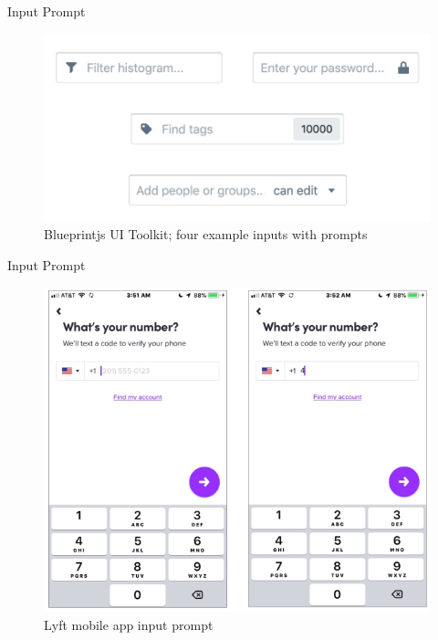 \documentclass{beamer}
\begin{document}
\begin{frame}[t]{Input Prompt}
	\begin{figure}[h]
		\centering
		\includegraphics[scale=0.6]{images/lec08-pic46.png}
		\caption{Blueprintjs UI Toolkit; four example inputs with prompts}
	\end{figure}
\end{frame}

\begin{frame}[t]{Input Prompt}
	\begin{figure}[h]
		\centering
		\includegraphics[scale=0.6]{images/lec08-pic47.png}
		\caption{Lyft mobile app input prompt}
	\end{figure}
\end{frame}
\end{document}
